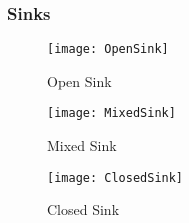 \subsubsection*{Sinks}
\begin{figure*}[htbp]
	\centering
	\begin{subfigure}{0.49\textwidth}
		\texttt{[image: OpenSink]}
		\caption{Open Sink}
		\label{fig:openSink}
	\end{subfigure}
	\begin{subfigure}{0.49\textwidth}
		\texttt{[image: MixedSink]}
		\caption{Mixed Sink}
		\label{fig:mixedSink}
	\end{subfigure}
	\begin{subfigure}{0.49\textwidth}
		\texttt{[image: ClosedSink]}
		\caption{Closed Sink}
		\label{fig:closedSink}
	\end{subfigure}
\end{figure*}